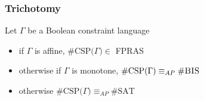 \documentclass[a4paper,handout]{beamer}
\newcommand{\pname}[1]{\textsc{#1}}
\newcommand{\ccsp}{\#CSP}
\newcommand{\cbis}{\#\textsc{BIS}}
\newcommand{\cdsp}{\pname{\#DownSets}}
\newcommand{\csat}{\#SAT}
\newcommand{\aple}{\le_{AP}}
\newcommand{\apeq}{\equiv_{AP}}
\theoremstyle{definition}
\begin{document}
\begin{comment}
\begin{frame}
\frametitle{\cdsp}
\begin{center}
\begin{tikzpicture}
\GraphInit[vstyle=Shade]
\tikzset{EdgeStyle/.style ={->, color = myorange}}
\tikzset{VertexStyle/.style ={shape=circle,ball color = mygreen,}}
\Vertices[unit=1]{circle}{B,A}
\Edge (A)(B)
\Loop[dist=30pt, dir=NO](A)
\Loop[dist=30pt, dir=NO](B)
\end{tikzpicture}
\end{center}

\begin{definition} [\cdsp]
Input: A partial order \(P\) \\
Output: The number of downsets in \(P\)
\end{definition}
\end{frame}
\end{comment}

\begin{frame}
\frametitle{Trichotomy}
\begin{theorem} 
Let \(\Gamma\) be a \textcolor{mygreen}{Boolean} constraint language\\
\begin{itemize}
\item if \(\Gamma\) is \textcolor{mygreen}{affine}, \(\mathrm{\ccsp(}\Gamma\mathrm{)} \in \) FPRAS
\item otherwise if \(\Gamma\) is \textcolor{mygreen}{monotone}, \(\mathrm{\ccsp(}\Gamma\mathrm{)} \apeq \mathrm{\cbis}\)
\item otherwise \(\mathrm{\ccsp(}\Gamma\mathrm{)} \apeq \mathrm{\csat}\) 
\end{itemize}
\end{theorem}
\end{frame}

\begin{comment}
\begin{frame}
\frametitle{Techniques For AP-reductions}
Let \(A\) and \(B\) be two counting problems; \(B \aple A\) if
\begin{itemize}
\item \(B\) is same as \(A\) only the input must be connected\\
\pause
\item both \(A\) and \(B\) have always at least one solution and \\
there is a function \(\varphi\) mapping an instance \(\mathcal{P}\) of \(B\) to an instance of \(A\) such that
\[\#\mathcal{P} = a \cdot \#\varphi(\mathcal{P}) + b\]
\end{itemize}
\end{frame}
\end{comment}
\end{document}
